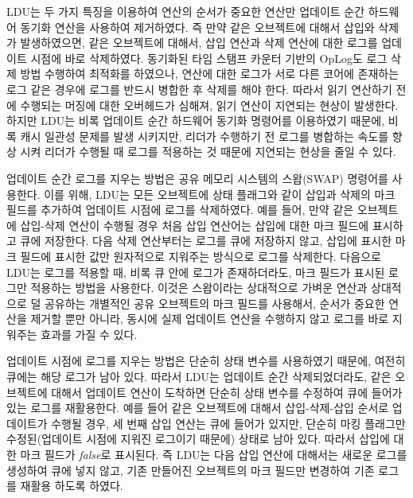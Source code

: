 LDU는 두 가지 특징을 이용하여 연산의 순서가 중요한 연산만 업데이트 순간 하드웨어 
동기화 연산을 사용하여 제거하였다. 
즉 만약 같은 오브젝트에 대해서 삽입와 삭제가 발생하였으면, 
같은 오브젝트에 대해서, 삽입 연산과 삭제 연산에 대한 로그를 업데이트 시점에 바로 삭제하였다. 
동기화된 타임 스탬프 카운터 기반의 OpLog도 로그 삭제 방법 
수행하여 최적화를 하였으나, 연산에 대한 로그가 서로 다른 코어에 존재하는 로그 같은 경우에 
로그를 반드시 병합한 후 삭제를 해야 한다.
따라서 읽기 연산하기 전에 수행되는 머징에 대한 오버헤드가 심해져, 읽기 연산이 지연되는 현상이 발생한다.
하지만 LDU는 비록 업데이트 순간 하드웨어 동기화 명령어를 이용하였기 때문에,
비록 캐시 일관성 문제를 발생 시키지만, 리더가 수행하기 전 로그를 병합하는 속도를 향상 시켜 
리더가 수행될 때 로그를 적용하는 것 때문에 지연되는 현상을 줄일 수 있다.

업데이트 순간 로그를 지우는 방법은 공유 메모리 시스템의 스왑(SWAP) 명령어를 사용한다.
이를 위해, LDU는 모든 오브젝트에 상태 플래그와 같이 삽입과 삭제의 마크 필드를 추가하여
업데이트 시점에 로그를 삭제하였다. 
예를 들어, 만약 같은 오브젝트에 삽입-삭제 연산이 수행될 경우 처음 삽입 연산어는
삽입에 대한 마크 필드에 표시하고 큐에 저장한다. 
다음 삭제 연산부터는 로그를 큐에 저장하지 않고, 삽입에 표시한 마크 필드에 표시한 값만
원자적으로 지워주는 방식으로 로그를 삭제한다.
다음으로 LDU는 로그를 적용할 때, 비록 큐 안에 로그가 존재하더라도, 마크 필드가 표시된 로그만 적용하는 방법을 사용한다.
이것은 스왑이라는 상대적으로 가벼운 연산과 상대적으로 덜 공유하는 개별적인 공유 오브젝트의
마크 필드를 사용해서, 순서가 중요한 연산을 제거할 뿐만 아니라, 동시에 실제
업데이트 연산을 수행하지 않고 로그를 바로 지워주는 효과를 가질 수 있다. 

업데이트 시점에 로그를 지우는 방법은 단순히 상태 변수를 사용하였기 때문에, 여전히 큐에는 해당 
로그가 남아 있다.
따라서 LDU는 업데이트 순간 삭제되었더라도, 같은 오브젝트에 대해서 업데이트 연산이 도착하면
단순히 상태 변수를 수정하여 큐에 들어가 있는 로그를 재활용한다.
예를 들어 같은 오브젝트에 대해서 삽입-삭제-삽입 순서로 업데이트가 수행될 경우, 
세 번째 삽입 연산는 큐에 들어가 있지만, 단순히 마킹 플래그만 
수정된(업데이트 시점에 지워진 로그이기 때문에) 상태로 남아 있다. 
따라서 삽입에 대한 마크 필드가 \textit{false}로 표시된다. 
즉 LDU는 다음 삽입 연산에 대해서는 새로운 로그를 생성하여 큐에 넣지 않고, 
기존 만들어진 오브젝트의 마크 필드만 변경하여 기존 로그를 재활용 하도록 하였다.

